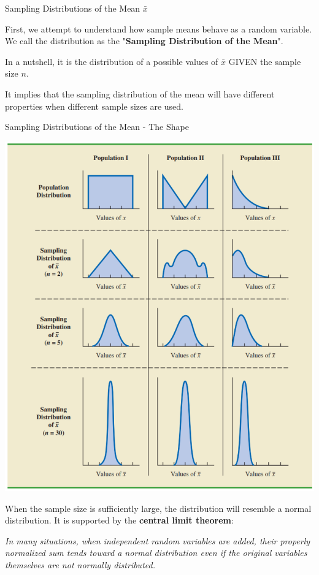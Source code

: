 \documentclass{beamer}
\begin{document}
\begin{frame}{Sampling Distributions of the Mean $\bar{x}$}

First, we attempt to understand how sample means behave as a random variable. We call the distribution as the "\textbf{Sampling Distribution of the Mean}". 

\vspace{0.3 cm}
In a nutshell, it is the distribution of a possible values of $\bar{x}$ GIVEN the sample size $n$. 

\vspace{0.3 cm}
It implies that the sampling distribution of the mean will have different properties when different sample sizes are used. 


\end{frame}


\begin{frame}{Sampling Distributions of the Mean - The Shape}

\begin{multicols}{2}

\includegraphics[scale=0.23]{images/section4SamplingDistfromPop.png}

When the sample size is sufficiently large, the distribution will resemble a normal distribution. It is supported by the \textbf{central limit theorem}: 

\vspace{0.1 cm}
\textit{In many situations, when independent random variables are added, their properly normalized sum tends toward a normal distribution even if the original variables themselves are not normally distributed.}


\end{multicols}

\end{frame}
\end{document}
